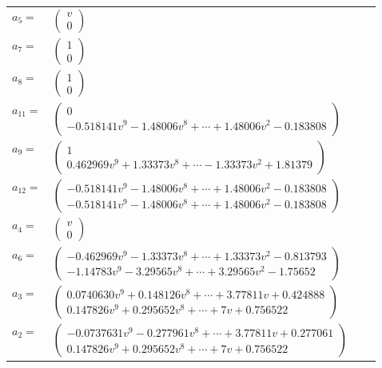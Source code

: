 \documentclass[1p]{elsarticle_modified}
\theoremstyle{definition}
\begin{document}
\begin{tabular}{m{7pt} m{180pt} m{7pt} m{180pt} }
\flushright $a_{5}=$&$\begin{pmatrix}v\\0\end{pmatrix}$ \\
\flushright $a_{7}=$&$\begin{pmatrix}1\\0\end{pmatrix}$ \\
\flushright $a_{8}=$&$\begin{pmatrix}1\\0\end{pmatrix}$ \\
\flushright $a_{11}=$&$\begin{pmatrix}0\\-0.518141 v^{9}-1.48006 v^{8}+\cdots+1.48006 v^{2}-0.183808\end{pmatrix}$ \\
\flushright $a_{9}=$&$\begin{pmatrix}1\\0.462969 v^{9}+1.33373 v^{8}+\cdots-1.33373 v^{2}+1.81379\end{pmatrix}$ \\
\flushright $a_{12}=$&$\begin{pmatrix}-0.518141 v^{9}-1.48006 v^{8}+\cdots+1.48006 v^{2}-0.183808\\-0.518141 v^{9}-1.48006 v^{8}+\cdots+1.48006 v^{2}-0.183808\end{pmatrix}$ \\
\flushright $a_{4}=$&$\begin{pmatrix}v\\0\end{pmatrix}$ \\
\flushright $a_{6}=$&$\begin{pmatrix}-0.462969 v^{9}-1.33373 v^{8}+\cdots+1.33373 v^{2}-0.813793\\-1.14783 v^{9}-3.29565 v^{8}+\cdots+3.29565 v^{2}-1.75652\end{pmatrix}$ \\
\flushright $a_{3}=$&$\begin{pmatrix}0.0740630 v^{9}+0.148126 v^{8}+\cdots+3.77811 v+0.424888\\0.147826 v^{9}+0.295652 v^{8}+\cdots+7 v+0.756522\end{pmatrix}$ \\
\flushright $a_{2}=$&$\begin{pmatrix}-0.0737631 v^{9}-0.277961 v^{8}+\cdots+3.77811 v+0.277061\\0.147826 v^{9}+0.295652 v^{8}+\cdots+7 v+0.756522\end{pmatrix}$ \\

\end{tabular}
\end{document}
